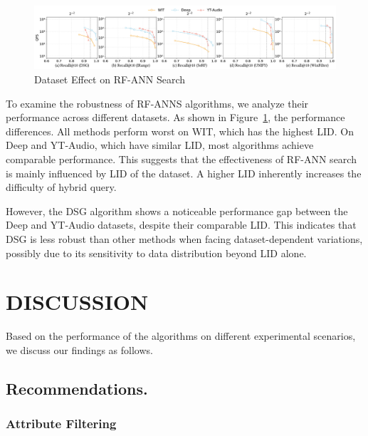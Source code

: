 \documentclass[sigconf, nonacm]{acmart}
\begin{document}
%     
\begin{figure}[htbp]
    \centering
    \includegraphics[width=\textwidth]{figures/exp/exp_8_3.pdf}
    \caption{Dataset Effect on RF-ANN Search}
    \label{fig:exp_8_3}
\end{figure}


To examine the robustness of RF-ANNS algorithms, we analyze their performance across different datasets. As shown in Figure~\ref{fig:exp_8_3}, the performance differences. All methods perform worst on WIT, which has the highest LID. On Deep and YT-Audio, which have similar LID, most algorithms achieve comparable performance. 
This suggests that the effectiveness of RF-ANN search is mainly influenced by LID of the dataset. A higher LID inherently increases the difficulty of hybrid query.

However, the DSG algorithm shows a noticeable performance gap between the Deep and YT-Audio datasets, despite their comparable LID. This indicates that DSG is less robust than other methods when facing dataset-dependent variations, possibly due to its sensitivity to data distribution beyond LID alone.

\section{DISCUSSION}
Based on the performance of the algorithms on different experimental scenarios, we discuss our findings as follows.


\subsection{Recommendations.}
\subsubsection{\textbf{Attribute Filtering}}
\end{document}
